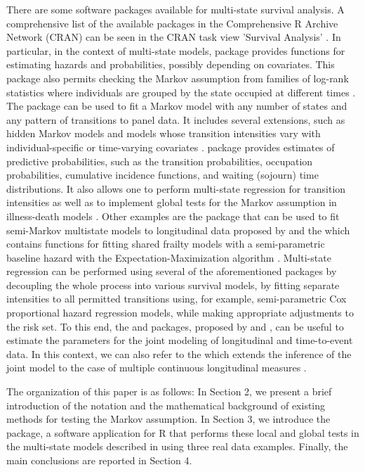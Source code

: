 There are some software packages available for multi-state survival analysis. A comprehensive list of the available packages in the Comprehensive R Archive Network (CRAN) can be seen in the CRAN task view 'Survival Analysis' \citep{Allignol2018}. In particular, in the context of multi-state models,  package provides functions for estimating hazards and probabilities, possibly depending on covariates. This package also permits checking the Markov assumption from families of log-rank statistics where individuals are grouped by the state occupied at different times \citep{Titman2020}. The  package can be used to fit a Markov model with any number of states and any pattern of transitions to panel data. It includes several extensions, such as hidden Markov models and models whose transition intensities vary with individual-specific or time-varying covariates \citep{Jackson2011}.  package provides estimates of predictive probabilities, such as the transition probabilities, occupation probabilities, cumulative incidence functions, and waiting (sojourn) time distributions. It also allows one to perform multi-state regression for transition intensities as well as to implement global tests for the Markov assumption in illness-death models \citep{soutinho2021}. Other examples are the  package that can be used to fit semi-Markov multistate models to longitudinal data proposed by \cite{Krol2015} and the  which contains functions for fitting shared frailty models with a semi-parametric baseline hazard with the Expectation-Maximization algorithm \citep{Balan2019}. Multi-state regression can be performed using several of the aforementioned packages by decoupling the whole process into various survival models, by fitting separate intensities to all permitted transitions using, for example, semi-parametric Cox proportional hazard regression models, while making appropriate adjustments to the risk set. To this end, the  and  packages, proposed by \cite{JM} and \cite{joineR}, can be useful to estimate the parameters for the joint modeling of longitudinal and time-to-event data. In this context, we can also refer to the  which extends the inference of the joint model to the case of multiple continuous longitudinal measures \citep{joineRML}.

The organization of this paper is as follows: In Section 2, we present a brief introduction of the notation and the mathematical background of existing methods for testing the Markov assumption. In Section 3, we introduce the  package, a software application for R that performs these local and global tests in the multi-state models described in \cite{soutinho_machado2020} using three real data examples. Finally, the main conclusions are reported in Section 4.

